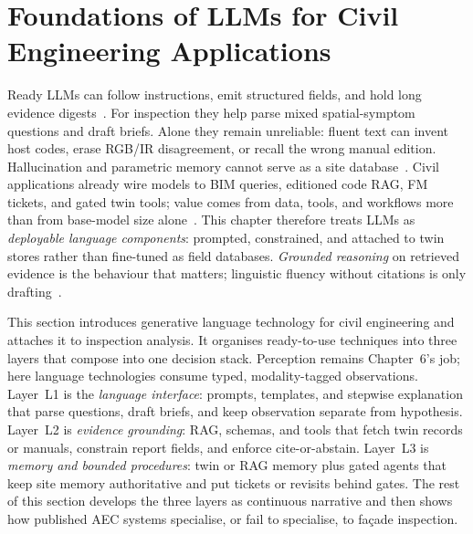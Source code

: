 \section{Foundations of LLMs for Civil Engineering Applications}
\label{sec:ch8-llm-foundations}

Ready LLMs can follow instructions, emit structured fields, and hold long evidence digests~\cite{brown2020,ouyang2022instructgpt,vaswani2017attention}. For inspection they help parse mixed spatial-symptom questions and draft briefs. Alone they remain unreliable: fluent text can invent host codes, erase RGB/IR disagreement, or recall the wrong manual edition. Hallucination and parametric memory cannot serve as a site database~\cite{ji2023,lewis2020,saka2024gptconstruction}. Civil applications already wire models to BIM queries, editioned code RAG, FM tickets, and gated twin tools; value comes from data, tools, and workflows more than from base-model size alone~\cite{zheng2023bimassistant,joffe2025buildingcodes,krutli2025fmrags,gao2026ifcagent,luo2025llmdtrobot,ma2026tenquestions}. This chapter therefore treats LLMs as \emph{deployable language components}: prompted, constrained, and attached to twin stores rather than fine-tuned as field databases. \emph{Grounded reasoning} on retrieved evidence is the behaviour that matters; linguistic fluency without citations is only drafting~\cite{lewis2020,krutli2025fmrags}.

This section introduces generative language technology for civil engineering and attaches it to inspection analysis. It organises ready-to-use techniques into three layers that compose into one decision stack. Perception remains Chapter~6's job; here language technologies consume typed, modality-tagged observations. Layer~L1 is the \emph{language interface}: prompts, templates, and stepwise explanation that parse questions, draft briefs, and keep observation separate from hypothesis. Layer~L2 is \emph{evidence grounding}: RAG, schemas, and tools that fetch twin records or manuals, constrain report fields, and enforce cite-or-abstain. Layer~L3 is \emph{memory and bounded procedures}: twin or RAG memory plus gated agents that keep site memory authoritative and put tickets or revisits behind gates. The rest of this section develops the three layers as continuous narrative and then shows how published AEC systems specialise, or fail to specialise, to fa\c{c}ade inspection.

